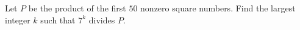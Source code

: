 Let $P$ be the product of the first $50$ nonzero square numbers. Find the largest integer $k$ such that $7^k$ divides $P$.